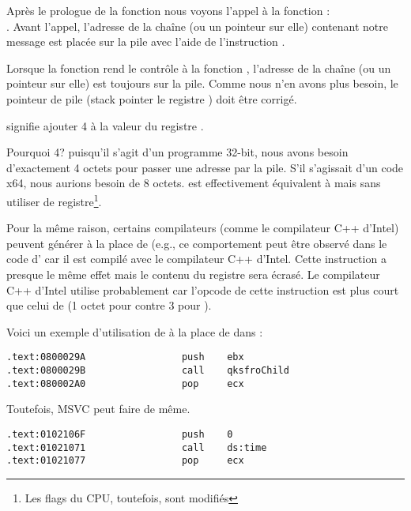 Après le prologue de la fonction nous voyons l'appel à la fonction \printf{}:\\
.
Avant l'appel, l'adresse de la chaîne (ou un pointeur sur elle) contenant notre message
 est placée sur la pile avec l'aide de l'instruction \PUSH.

Lorsque la fonction \printf rend le contrôle à la fonction \main, l'adresse de la chaîne (ou un pointeur sur elle)
est toujours sur la pile.
Comme nous n'en avons plus besoin, le pointeur de pile (\gls{stack pointer} le registre \ESP) doit être corrigé.

 signifie ajouter 4 à la valeur du registre \ESP.

Pourquoi 4? puisqu'il s'agit d'un programme 32-bit, nous avons besoin d'exactement 4 octets pour passer une adresse
par la pile. S'il s'agissait d'un code x64, nous aurions besoin de 8 octets.
 est effectivement équivalent à  mais sans utiliser de registre\footnote{Les
flags du CPU, toutefois, sont modifiés}.

\myindex{\oracle}

Pour la même raison, certains compilateurs (comme le compilateur C++ d'Intel) peuvent générer 
à la place de \ADD (e.g., ce comportement peut être observé dans le code d'\oracle{} car il est
compilé avec le compilateur C++ d'Intel.
Cette instruction a presque le même effet mais le contenu du registre \ECX sera écrasé.
Le compilateur C++ d'Intel utilise probablement  car l'opcode de cette instruction est plus
 court que celui de  (1 octet pour  contre 3 pour ).

Voici un exemple d'utilisation de \POP à la place de \ADD dans \oracle{}:

\begin{lstlisting}[caption=\oracle 10.2 Linux (app.o file),style=customasmx86]
.text:0800029A                 push    ebx
.text:0800029B                 call    qksfroChild
.text:080002A0                 pop     ecx
\end{lstlisting}

Toutefois, MSVC peut faire de même.

\begin{lstlisting}[caption=MineSweeper de Windows 7 32-bit]
.text:0102106F                 push    0
.text:01021071                 call    ds:time
.text:01021077                 pop     ecx
\end{lstlisting}

